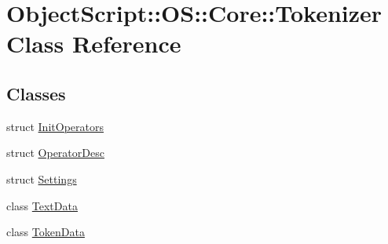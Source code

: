\hypertarget{class_object_script_1_1_o_s_1_1_core_1_1_tokenizer}{}\section{Object\+Script\+:\+:OS\+:\+:Core\+:\+:Tokenizer Class Reference}
\label{class_object_script_1_1_o_s_1_1_core_1_1_tokenizer}
\subsection*{Classes}
\begin{DoxyCompactItemize}
\item 
struct \hyperlink{struct_object_script_1_1_o_s_1_1_core_1_1_tokenizer_1_1_init_operators}{Init\+Operators}
\item 
struct \hyperlink{struct_object_script_1_1_o_s_1_1_core_1_1_tokenizer_1_1_operator_desc}{Operator\+Desc}
\item 
struct \hyperlink{struct_object_script_1_1_o_s_1_1_core_1_1_tokenizer_1_1_settings}{Settings}
\item 
class \hyperlink{class_object_script_1_1_o_s_1_1_core_1_1_tokenizer_1_1_text_data}{Text\+Data}
\item 
class \hyperlink{class_object_script_1_1_o_s_1_1_core_1_1_tokenizer_1_1_token_data}{Token\+Data}
\end{DoxyCompactItemize}
